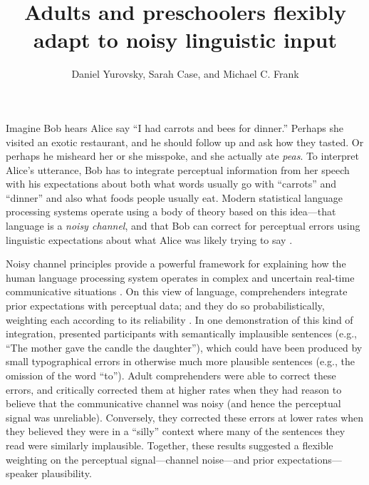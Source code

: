 \documentclass[man,floatsintext]{apa6}
\title{Adults and preschoolers flexibly adapt to noisy linguistic input}
\author{Daniel Yurovsky, Sarah Case, and Michael C. Frank}
\affiliation{Stanford University}
\begin{document}
\maketitle

Imagine Bob hears Alice say ``I had carrots and bees for dinner.'' Perhaps she visited an exotic restaurant, and he should follow up and ask how they tasted. Or perhaps he misheard her or she misspoke, and she actually ate \emph{peas}. To interpret Alice's utterance, Bob has to integrate perceptual information from her speech with his expectations about both what words usually go with ``carrots'' and ``dinner'' and also what foods people usually eat. Modern statistical language processing systems operate using a body of theory based on this idea---that language is a \emph{noisy channel}, and that Bob can correct for perceptual errors using linguistic expectations about what Alice was likely trying to say \cite{jelinek1976, shannon1948}. 

Noisy channel principles provide a powerful framework for explaining how the human language processing system operates in complex and uncertain real-time communicative situations \cite{clayards2008, levy2008, jaeger2010, kleinschmidt2015}. On this view of language, comprehenders integrate prior expectations with perceptual data; and they do so probabilistically, weighting each according to its reliability \cite{ernst2002, jacobs1999}. In one demonstration of this kind of integration,  presented participants with semantically implausible sentences (e.g., ``The mother gave the candle the daughter''), which could have been produced by small typographical errors in otherwise much more plausible sentences (e.g., the omission of the word ``to''). Adult comprehenders were able to correct these errors, and critically corrected them at higher rates when they had reason to believe that the communicative channel was noisy (and hence the perceptual signal was unreliable). Conversely, they corrected these errors at lower rates when they believed they were in a ``silly'' context where many of the sentences they read were similarly implausible. Together, these results suggested a flexible weighting on the perceptual signal---channel noise---and prior expectations---speaker plausibility. 
\end{document}
